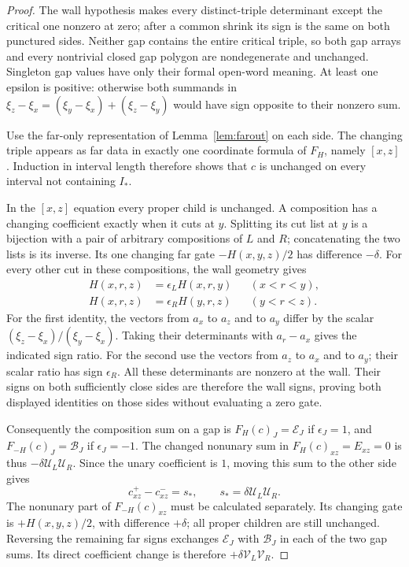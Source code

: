 \begin{proof}
The wall hypothesis makes every distinct-triple determinant except the
critical one nonzero at zero; after a common shrink its sign is the
same on both punctured sides. Neither gap contains the entire critical
triple, so both gap arrays and every nontrivial closed gap polygon are
nondegenerate and unchanged. Singleton gap values have only their formal
open-word meaning. At least one epsilon is positive: otherwise both
summands in $\xi_z-\xi_x=(\xi_y-\xi_x)+(\xi_z-\xi_y)$ would have
sign opposite to their nonzero sum.

Use the far-only representation of Lemma~\ref{lem:farout} on each side.
The changing triple appears as far data in exactly one coordinate formula
of $F_H$, namely $[x,z]$.  Induction in interval length therefore shows
that $c$ is unchanged on every interval not containing $I_*$.

In the $[x,z]$ equation every proper child is unchanged.  A composition
has a changing coefficient exactly when it cuts at $y$.  Splitting its
cut list at $y$ is a bijection with a pair of arbitrary compositions of
$L$ and $R$; concatenating the two lists is its inverse.  Its one
changing far gate $-H(x,y,z)/2$ has difference $-\delta$.
For every other cut in these compositions, the wall geometry gives
\begin{align}
 H(x,r,z)&=\epsilon_L H(x,r,y) &&(x<r<y),\label{afr:wall-left-sign}\\
 H(x,r,z)&=\epsilon_R H(y,r,z) &&(y<r<z).\label{afr:wall-right-sign}
\end{align}
For the first identity, the vectors from $a_x$ to $a_z$ and to $a_y$
differ by the scalar $(\xi_z-\xi_x)/(\xi_y-\xi_x)$.
Taking their determinants with $a_r-a_x$ gives the indicated sign ratio.
For the second use the vectors from $a_z$ to $a_x$ and to $a_y$;
their scalar ratio has sign $\epsilon_R$.  All these determinants are
nonzero at the wall.  Their signs on both sufficiently close sides are
therefore the wall signs, proving both displayed identities on those
sides without evaluating a zero gate.

Consequently the composition sum on a gap is $F_H(c)_J=\mathcal E_J$ if
$\epsilon_J=1$, and $F_{-H}(c)_J=\mathcal B_J$ if $\epsilon_J=-1$.
The changed nonunary sum in $F_H(c)_{xz}=E_{xz}=0$ is thus
$-\delta \mathcal U_L\mathcal U_R$.  Since the unary coefficient is $1$, moving this
sum to the other side gives
\begin{equation}\label{afr:wall-source}
 c^+_{xz}-c^-_{xz}=s_*,
 \qquad s_*=\delta \mathcal U_L\mathcal U_R.
\end{equation}
The nonunary part of $F_{-H}(c)_{xz}$ must be calculated separately.
Its changing gate is $+H(x,y,z)/2$, with difference $+\delta$;
all proper children are still unchanged.  Reversing the remaining far
signs exchanges $\mathcal E_J$ with $\mathcal B_J$ in each of the two gap sums.
Its direct coefficient change is therefore $+\delta \mathcal V_L\mathcal V_R$.


\end{proof}
